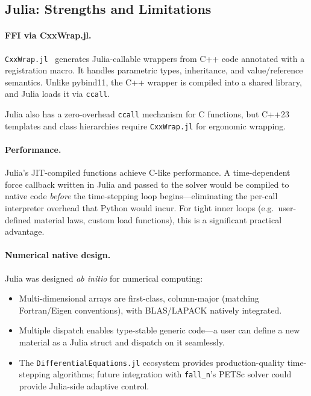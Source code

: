 \subsection{Julia: Strengths and Limitations}
\label{sec:julia-analysis}

\paragraph{FFI via CxxWrap.jl.}
\texttt{CxxWrap.jl}~\cite{CxxWrap} generates Julia-callable
wrappers from C++ code annotated with a registration macro.
It handles parametric types, inheritance, and value/reference
semantics.  Unlike pybind11, the C++ wrapper is compiled into a
shared library, and Julia loads it via \texttt{ccall}.

Julia also has a zero-overhead \texttt{ccall} mechanism for C
functions, but C++23 templates and class hierarchies require
\texttt{CxxWrap.jl} for ergonomic wrapping.

\paragraph{Performance.}
Julia's JIT-compiled functions achieve C-like performance.  A
time-dependent force callback written in Julia and passed to the
solver would be compiled to native code \emph{before} the time-stepping
loop begins---eliminating the per-call interpreter overhead that
Python would incur.  For tight inner loops (e.g.\ user-defined
material laws, custom load functions), this is a significant
practical advantage.

\paragraph{Numerical native design.}
Julia was designed \emph{ab initio} for numerical computing:
\begin{itemize}
  \item Multi-dimensional arrays are first-class, column-major
        (matching Fortran/Eigen conventions), with BLAS/LAPACK
        natively integrated.
  \item Multiple dispatch enables type-stable generic code---a
        user can define a new material as a Julia struct and
        dispatch on it seamlessly.
  \item The \texttt{DifferentialEquations.jl} ecosystem provides
        production-quality time-stepping algorithms; future
        integration with \texttt{fall\_n}'s PETSc solver could
        provide Julia-side adaptive control.
\end{itemize}

